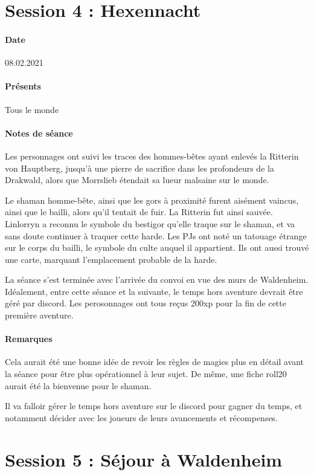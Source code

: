 \documentclass[10pt,a4paper]{book}
\begin{document}
\section{Session 4 : Hexennacht}
\paragraph{Date}08.02.2021
\paragraph{Présents} Tous le monde
\paragraph{Notes de séance}
Les personnages ont suivi les traces des hommes-bêtes ayant enlevés la Ritterin von Hauptberg, jusqu'à une pierre de sacrifice dans les profondeurs de la Drakwald, alors que Morrslieb étendait sa lueur malsaine sur le monde.

Le shaman homme-bête, ainsi que les gors à proximité furent aisément vaincus, ainsi que le bailli, alors qu'il tentait de fuir. La Ritterin fut ainsi sauvée. Linlorryn a reconnu le symbole du bestigor qu'elle traque sur le shaman, et va sans doute continuer à traquer cette harde. Les PJs ont noté un tatouage étrange sur le corps du bailli, le symbole du culte auquel il appartient. Ils ont aussi trouvé une carte, marquant l'emplacement probable de la harde.

La séance s'est terminée avec l'arrivée du convoi en vue des murs de Waldenheim. Idéalement, entre cette séance et la suivante, le temps hors aventure devrait être géré par discord. Les perosonnages ont tous reçus 200xp pour la fin de cette première aventure.

\paragraph{Remarques}
Cela aurait été une bonne idée de revoir les règles de magies plus en détail avant la séance pour être plus opérationnel à leur sujet. De même, une fiche roll20 aurait été la bienvenue pour le shaman.

Il va falloir gérer le temps hors aventure sur le discord pour gagner du temps, et notamment décider avec les joueurs de leurs avancements et récompenses.
\section{Session 5 : Séjour à Waldenheim}
\end{document}
